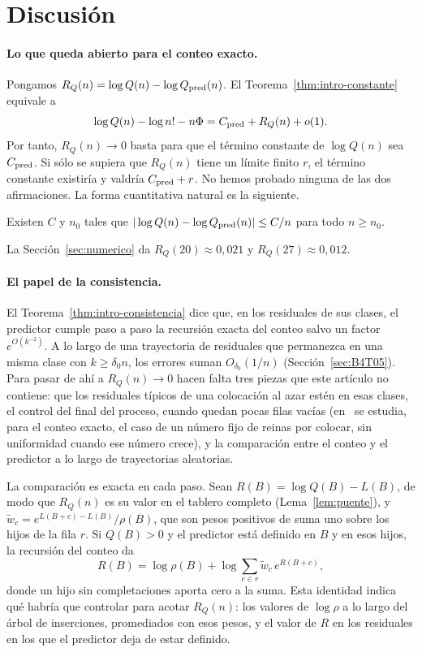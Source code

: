 \section{Discusión}\label{sec:discusion}

\paragraph{Lo que queda abierto para el conteo exacto.}
Pongamos $R_Q(n)=\log Q(n)-\log Q_{\rm pred}(n)$. El Teorema~\ref{thm:intro-constante} equivale a
\[
 \log Q(n)-\log n!-n\Phi=C_{\rm pred}+R_Q(n)+o(1).
\]
Por tanto, $R_Q(n)\to0$ basta para que el término constante de $\log Q(n)$ sea $C_{\rm pred}$. Si
sólo se supiera que $R_Q(n)$ tiene un límite finito $r$, el término constante existiría y valdría
$C_{\rm pred}+r$. No hemos probado ninguna de las dos afirmaciones. La forma cuantitativa natural
es la siguiente.

\begin{conjetura}\label{conj:RQ}
Existen $C$ y $n_0$ tales que $|\log Q(n)-\log Q_{\rm pred}(n)|\le C/n$ para todo $n\ge n_0$.
\end{conjetura}

La Sección~\ref{sec:numerico} da $R_Q(20)\approx0{,}021$ y $R_Q(27)\approx0{,}012$.

\paragraph{El papel de la consistencia.}
El Teorema~\ref{thm:intro-consistencia} dice que, en los residuales de sus clases, el predictor cumple
paso a paso la recursión exacta del conteo salvo un factor $e^{O(k^{-2})}$. A lo largo de una trayectoria de
residuales que
permanezca en una misma clase con $k\ge\delta_0n$, los errores suman $O_{\delta_0}(1/n)$
(Sección~\ref{sec:B4T05}). Para pasar de ahí a $R_Q(n)\to0$ hacen falta tres piezas que este artículo
no contiene: que los residuales típicos de una colocación al azar estén en esas clases, el control del
final del proceso, cuando quedan pocas filas vacías (en~\cite{Completabilidad} se estudia, para el
conteo exacto, el caso de un número fijo de reinas por colocar, sin uniformidad cuando ese número
crece), y la comparación entre el conteo y el predictor a
lo largo de trayectorias aleatorias.

La comparación es exacta en cada paso. Sean $R(B)=\log Q(B)-L(B)$, de modo que $R_Q(n)$ es su valor
en el tablero completo (Lema~\ref{lem:puente}), y $\tilde w_c=e^{L(B+c)-L(B)}/\rho(B)$, que son pesos
positivos de suma uno sobre los hijos de la fila $r$. Si $Q(B)>0$ y el predictor está definido en $B$
y en esos hijos, la recursión del conteo da
\[
 R(B)=\log\rho(B)+\log\sum_{c\in r}\tilde w_c\,e^{R(B+c)},
\]
donde un hijo sin completaciones aporta cero a la suma. Esta identidad indica qué habría que
controlar para acotar $R_Q(n)$: los valores de $\log\rho$ a lo largo del árbol de inserciones,
promediados con esos pesos, y el valor de $R$ en los residuales en los que el predictor deja de estar
definido.

